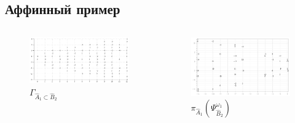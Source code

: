 \documentclass[pdftex]{beamer}
\theoremstyle{definition} \newtheorem{Def}{Определение}
\begin{document}
\subsection{Аффинный пример}
\begin{frame}[plain]
  \vspace*{-0.5cm}
  \begin{columns}
    \begin{figure}[b]
      \centering
      \includegraphics[width=60mm]{figures/figure10}      
      \caption{$\Gamma_{\hat A_1\subset \hat B_2}$}      
      \label{fig:2}
    \end{figure}

     \begin{figure}[b]
       \centering
      \includegraphics[width=60mm]{figures/figure12}
      \vspace*{-1cm}
      \caption{ $\pi_{\hat A_{1}}\left( \Psi ^{\omega_1  }_{\hat B_{2}}\right)$}
    \end{figure}


\end{columns}
\end{frame}
\end{document}
